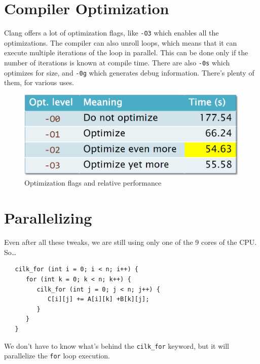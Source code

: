 \section{Compiler Optimization}
\begin{paracol}{2}
   \colfill
   Clang offers a lot of optimization flags, like \texttt{-O3} which enables all the optimizations. The compiler can also unroll loops, which means that it can execute multiple iterations of the loop in parallel. This can be done only if the number of iterations is known at compile time.
   There are also \texttt{-0s} which optimizes for size, and \texttt{-0g} which generates debug information. There's plenty of them, for various uses.
   \colfill
   
   \switchcolumn
   \begin{figure}[htbp]
      \centering
      \includegraphics{images/02/optimization.png}
      \caption{Optimization flags and relative performance}
      \label{fig:02/optimization}
   \end{figure}
\end{paracol}

\section{Parallelizing}
Even after all these tweaks, we are still using only one of the 9 cores of the CPU.
So\dots
\begin{lstlisting}
   cilk_for (int i = 0; i < n; i++) {
      for (int k = 0; k < n; k++) {
         cilk_for (int j = 0; j < n; j++) {
            C[i][j] += A[i][k] +B[k][j];
         }
      }
   }
\end{lstlisting}
We don't have to know what's behind the \texttt{cilk\_for} keyword, but it will parallelize the \texttt{for} loop execution.

